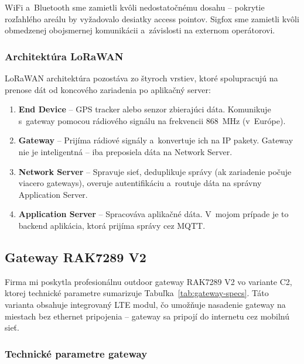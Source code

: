 WiFi a~Bluetooth sme zamietli kvôli nedostatočnému dosahu -- pokrytie rozľahlého areálu by vyžadovalo desiatky access pointov. Sigfox sme zamietli kvôli obmedzenej obojsmernej komunikácii a~závislosti na externom operátorovi.

\subsubsection{Architektúra LoRaWAN}

LoRaWAN architektúra pozostáva zo štyroch vrstiev, ktoré spolupracujú na prenose dát od koncového zariadenia po aplikačný server:

\begin{enumerate}
    \item \textbf{End Device} -- GPS tracker alebo senzor zbierajúci dáta. Komunikuje s~gateway pomocou rádiového signálu na frekvencii 868~MHz (v~Európe).

    \item \textbf{Gateway} -- Prijíma rádiové signály a~konvertuje ich na IP pakety. Gateway nie je inteligentná -- iba preposiela dáta na Network Server.

    \item \textbf{Network Server} -- Spravuje sieť, deduplikuje správy (ak zariadenie počuje viacero gateways), overuje autentifikáciu a~routuje dáta na správny Application Server.

    \item \textbf{Application Server} -- Spracováva aplikačné dáta. V~mojom prípade je to backend aplikácia, ktorá prijíma správy cez MQTT.
\end{enumerate}

\subsection{Gateway RAK7289 V2}
\label{sec:Gateway}

Firma mi poskytla profesionálnu outdoor gateway RAK7289 V2 vo variante C2, ktorej technické parametre sumarizuje Tabuľka~\ref{tab:gateway-specs}. Táto varianta obsahuje integrovaný LTE modul, čo umožňuje nasadenie gateway na miestach bez ethernet pripojenia -- gateway sa pripojí do internetu cez mobilnú sieť.

\subsubsection{Technické parametre gateway}

